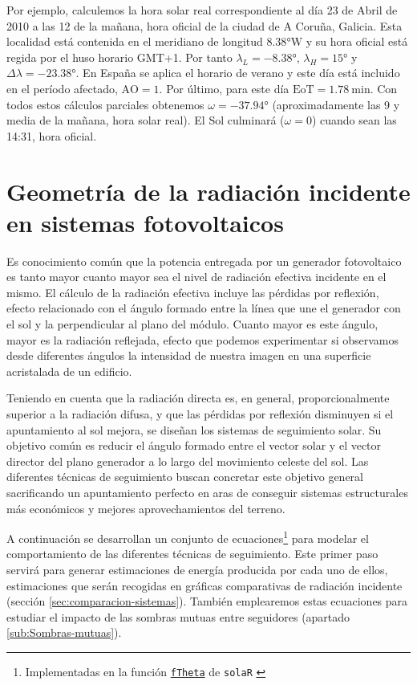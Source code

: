 Por ejemplo, calculemos la hora solar real correspondiente al día
23 de Abril de 2010 a las 12 de la mañana, hora oficial de la ciudad
de A Coruña, Galicia. Esta localidad está contenida en el meridiano
de longitud $\ang{8.38}\mathrm{W}$ y su hora oficial está regida
por el huso horario GMT+1. Por tanto $\lambda_{L}=\ang{-8.38}$,
$\lambda_{H}=\ang{15}$ y $\Delta\lambda=\ang{-23.38}$. En España
se aplica el horario de verano y este día está incluido en el período
afectado, $\mathrm{AO}=1$. Por último, para este día $\mathrm{EoT=\SI{1.78}{\minute}}$.
Con todos estos cálculos parciales obtenemos $\omega=\ang{-37.94}$
(aproximadamente las 9 y media de la mañana, hora solar real). El
Sol culminará ($\omega=0$) cuando sean las 14:31, hora oficial.


\section{Geometría de la radiación incidente en sistemas fotovoltaicos}
\label{sec:geometria-sistemas}

Es conocimiento común que la potencia entregada por un generador
fotovoltaico es tanto mayor cuanto mayor sea el nivel de radiación
efectiva incidente en el mismo. El cálculo de la radiación efectiva
incluye las pérdidas por reflexión, efecto relacionado con el ángulo
formado entre la línea que une el generador con el sol y la
perpendicular al plano del módulo.  Cuanto mayor es este ángulo, mayor
es la radiación reflejada, efecto que podemos experimentar si
observamos desde diferentes ángulos la intensidad de nuestra imagen en
una superficie acristalada de un edificio.

Teniendo en cuenta que la radiación directa es, en general,
proporcionalmente superior a la radiación difusa, y que las pérdidas
por reflexión disminuyen si el apuntamiento al sol mejora, se diseñan
los sistemas de seguimiento solar. Su objetivo común es reducir el
ángulo formado entre el vector solar y el vector director del plano
generador a lo largo del movimiento celeste del sol. Las diferentes
técnicas de seguimiento buscan concretar este objetivo general
sacrificando un apuntamiento perfecto en aras de conseguir sistemas
estructurales más económicos y mejores aprovechamientos del terreno.

A continuación se desarrollan un conjunto de
ecuaciones\footnote{Implementadas en la función
  \href{http://search.r-project.org/R/library/solaR/html/fTheta.html}{\texttt{fTheta}}
  de \texttt{solaR} \cite{Perpinan2012b}} para modelar el
comportamiento de las diferentes técnicas de seguimiento. Este primer
paso servirá para generar estimaciones de energía producida por cada
uno de ellos, estimaciones que serán recogidas en gráficas
comparativas de radiación incidente (sección
\ref{sec:comparacion-sistemas}).  También emplearemos estas ecuaciones
para estudiar el impacto de las sombras mutuas entre seguidores
(apartado \ref{sub:Sombras-mutuas}).


